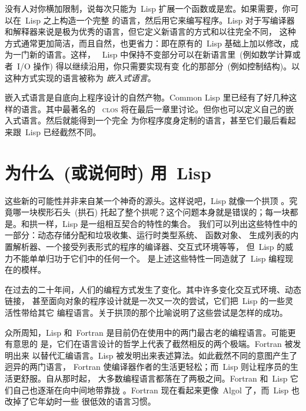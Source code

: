 没有人对你横加限制，说每次只能为~Lisp 扩展一个函数或是宏。如果需要，你可以在~Lisp 之上构造一个完整
的语言，然后用它来编写程序。Lisp 对于写编译器和解释器来说是极为优秀的语言，但它定义新语言的方式和以往完全不同，
这种方式通常更加简洁，而且自然，也更省力：即在原有的~Lisp 基础上加以修改，成为一门新的语言。这样，
~Lisp 中保持不变部分可以在新语言里~(例如数学计算或者~I/O 操作) 得以继续沿用，你只需要实现有变
化的那部分~(例如控制结构)。以这种方式实现的语言被称为
\emph{嵌入式语言}。

嵌入式语言是自底向上程序设计的自然产物。Common Lisp 里已经有了好几种这样的语言。其中最著名的
~\textsc{clos} 将在最后一章里讨论。但你也可以定义自己的嵌入式语言。然后就能得到一个完全
为你程序度身定制的语言，甚至它们最后看起来跟~Lisp 已经截然不同。

\section{为什么~(或说何时) 用~Lisp}
\label{sec:why_lisp}

这些新的可能性并非来自某一个神奇的源头。这样说吧，Lisp 就像一个拱顶
。究竟哪一块楔形石头~(拱石)
托起了整个拱呢？这个问题本身就是错误的；每一块都是。和拱一样，Lisp 是一组相互契合的特性的集合。
我们可以列出这些特性中的一部分：动态存储分配和垃圾收集、运行时类型系统、
函数对象、
生成列表的内置解析器、一个接受列表形式的程序的编译器、交互式环境等等，
但~Lisp 的威力不能单单归功于它们中的任何一个。
是上述这些特性一同造就了~Lisp 编程现在的模样。

在过去的二十年间，人们的编程方式发生了变化。其中许多变化\pozhehao{}交互式环境、动态链接，
甚至面向对象的程序设计\pozhehao{}就是一次又一次的尝试，它们把~Lisp 的一些灵活性带给其它
编程语言。关于拱顶的那个比喻说明了这些尝试是怎样的成功。

众所周知，Lisp 和~Fortran 是目前仍在使用中的两门最古老的编程语言。可能更有意思的
是，它们在语言设计的哲学上代表了截然相反的两个极端。Fortran 被发明出来
以替代汇编语言。Lisp 被发明出来表述算法。如此截然不同的意图产生了迥异的两门语言，
Fortran 使编译器作者的生活更轻松；而~Lisp 则让程序员的生活更舒服。自从那时起，
大多数编程语言都落在了两极之间。Fortran 和~Lisp 它们自己也逐渐在向中间地带靠拢
。Fortran 现在看起来更像~Algol 了，而~Lisp 也改掉了它年幼时一些
很低效的语言习惯。

